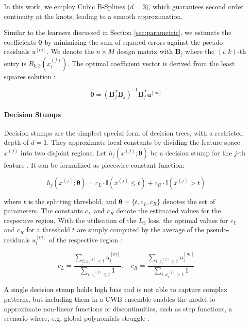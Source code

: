 \documentclass[fontsize=12 pt]{scrartcl}
\begin{document}
In this work, we employ Cubic B-Splines ($d=3$), which guarantees second order continuity at the knots, leading to a smooth approximation.

Similar to the learners discussed in Section \ref{sec:parametric}, we estimate the coefficients $\boldsymbol{\theta}$ by minimizing the sum of squared errors against the pseudo-residuals $u^{[m]}$. We denote the $n \times M$ design matrix with $\mathbf{B}_j$ where the $(i, k)$-th entry is $B_{k,3}(x_i^{(j)})$. The optimal coefficient vector is derived from the least squares solution \citep{hofner2014model}: 

\begin{equation}
    \hat{\boldsymbol{\theta}} = (\mathbf{B}_j^T \mathbf{B}_j)^{-1} \mathbf{B}_j^T \mathbf{u}^{[m]}
\end{equation}

\paragraph{Decision Stumps}

Decision stumps are the simplest special form of decision trees, with a restricted depth of $d=1$. They approximate local constants by dividing the feature space $x^{(j)}$ into two disjoint regions. Let  $h_j(x^{(j)}; \boldsymbol{\theta})$ be a decision stump for the $j$-th feature \citep{breiman1984cart}. It can be formalized as piecewise constant function:

\begin{equation}
    h_j(x^{(j)}; \boldsymbol{\theta}) = c_L \cdot \mathbb{I}(x^{(j)} \leq t) + c_R \cdot \mathbb{I}(x^{(j)} > t)
\end{equation}

where $t$ is the splitting threshold, and $\boldsymbol{\theta} = \{t, c_L, c_R\}$ denotes the set of parameters. The constants $c_L$ and $c_R$ denote the estimated values for the respective region. With the utilisation of the $L_2$ loss, the optimal values for $c_L$ and $c_R$ for a threshold $t$ are simply computed by the average of the pseudo-residuals $u_i^{[m]}$ of the respective region \citep{friedman2001greedy}:

\begin{equation}
c_L = \frac{\sum_{i: x_i^{(j)} \leq t} u_i^{[m]}}{\sum_{i: x_i^{(j)} \leq t} 1}, \quad
c_R = \frac{\sum_{i: x_i^{(j)} > t} u_i^{[m]}}{\sum_{i: x_i^{(j)} > t} 1}
\end{equation}

A single decision stump holds high bias and is not able to capture complex patterns, but including them in a CWB ensemble enables the model to approximate non-linear functions or discontinuities, such as step functions, a scenario where, e.g. global polynomials struggle \citep{hastie2009elements}.
\end{document}
